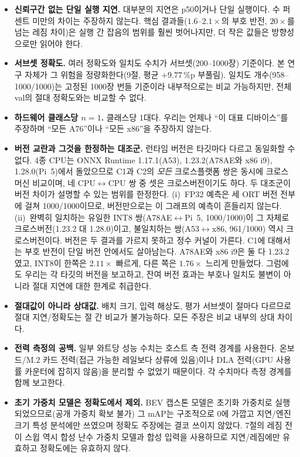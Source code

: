 \documentclass[11pt]{article}
\begin{document}
\begin{itemize}
\item \textbf{신뢰구간 없는 단일 실행 지연.} 대부분의 지연은 p50이거나 단일 실행이다. 수 퍼센트 미만의 차이는 주장하지 않는다. 핵심 결과들($1.6$--$2.1\times$의 부호 반전, $20\times$를 넘는 레짐 차이)은 실행 간 잡음의 범위를 훨씬 벗어나지만, 더 작은 값들은 방향성으로만 읽어야 한다.
\item \textbf{서브셋 정확도.} 여러 정확도와 일치도 수치가 서브셋(200--1000장) 기준이다. 본 연구 자체가 그 위험을 정량화한다(9절, 평균 $+9.77$\,\%p 부풀림). 일치도 개수(958--1000/1000)는 고정된 1000장 번들 기준이라 내부적으로는 비교 가능하지만, 전체 val의 절대 정확도와는 비교할 수 없다.
\item \textbf{하드웨어 클래스당 $n=1$.} 클래스당 1대다. 우리는 언제나 ``이 대표 디바이스''를 주장하며 ``모든 A76''이나 ``모든 x86''을 주장하지 않는다.
\item \textbf{버전 교란과 그것을 한정하는 대조군.} 런타임 버전은 타깃마다 다르고 동일화할 수 없다. 4종 CPU는 ONNX Runtime 1.17.1(A53), 1.23.2(A78AE와 x86 i9), 1.28.0(Pi~5)에서 돌았으므로 C1과 C2의 \emph{모든} 크로스플랫폼 쌍은 동시에 크로스머신 비교이며, 네 CPU$\leftrightarrow$CPU 쌍 중 셋은 크로스버전이기도 하다. 두 대조군이 버전 차이가 설명할 수 있는 범위를 한정한다. (i)~FP32 예측은 세 ORT 버전 전부에 걸쳐 1000/1000이므로, 버전만으로는 이 그래프의 예측이 흔들리지 않는다. (ii)~완벽히 일치하는 유일한 INT8 쌍(A78AE$\leftrightarrow$Pi~5, 1000/1000)이 그 자체로 크로스버전(1.23.2 대 1.28.0)이고, 불일치하는 쌍(A53$\leftrightarrow$x86, 961/1000) 역시 크로스버전이다. 버전은 두 결과를 가르지 못하고 정수 커널이 가른다. C1에 대해서는 부호 반전이 단일 버전 안에서도 살아남는다. A78AE와 x86 i9은 둘 다 1.23.2였고, INT8이 한쪽은 $2.11\times$ 빠르게, 다른 쪽은 $1.76\times$ 느리게 만들었다. 그럼에도 우리는 각 타깃의 버전을 보고하고, 잔여 버전 효과는 부호나 일치도 불변이 아니라 절대 지연에 대한 한계로 취급한다.
\item \textbf{절대값이 아니라 상대값.} 배치 크기, 입력 해상도, 평가 서브셋이 절마다 다르므로 절대 지연/정확도는 절 간 비교가 불가능하다. 모든 주장은 비교 내부의 상대 차이다.
\item \textbf{전력 측정의 공백.} 일부 와트당 성능 수치는 호스트 측 전력 경계를 사용한다. 온보드/M.2 카드 전력(접근 가능한 레일보다 상류에 있음)이나 DLA 전력(GPU 사용률 카운터에 잡히지 않음)을 분리할 수 없었기 때문이다. 각 수치마다 측정 경계를 함께 보고한다.
\item \textbf{초기 가중치 모델은 정확도에서 제외.} BEV 캡스톤 모델은 초기화 가중치로 실행되었으므로(공개 가중치 확보 불가) 그 mAP는 구조적으로 0에 가깝고 지연/엔진 크기 특성 분석에만 쓰였으며 정확도 주장에는 결코 쓰이지 않았다. 7절의 레짐 전이 스윕 역시 합성 난수 가중치 모델과 합성 입력을 사용하므로 지연/레짐에만 유효하고 정확도에는 유효하지 않다.

\end{itemize}
\end{document}
